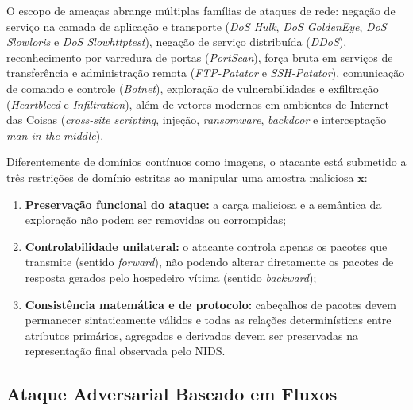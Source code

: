 \documentclass[conference]{IEEEtran}
\begin{document}
O escopo de ameaças abrange múltiplas famílias de ataques de rede: negação de serviço na camada de aplicação e transporte (\textit{DoS Hulk}, \textit{DoS GoldenEye}, \textit{DoS Slowloris} e \textit{DoS Slowhttptest}), negação de serviço distribuída (\textit{DDoS}), reconhecimento por varredura de portas (\textit{PortScan}), força bruta em serviços de transferência e administração remota (\textit{FTP-Patator} e \textit{SSH-Patator}), comunicação de comando e controle (\textit{Botnet}), exploração de vulnerabilidades e exfiltração (\textit{Heartbleed} e \textit{Infiltration}), além de vetores modernos em ambientes de Internet das Coisas (\textit{cross-site scripting}, injeção, \textit{ransomware}, \textit{backdoor} e interceptação \textit{man-in-the-middle}).

Diferentemente de domínios contínuos como imagens, o atacante está submetido a três restrições de domínio estritas ao manipular uma amostra maliciosa $\mathbf{x}$:
\begin{enumerate}
    \item \textbf{Preservação funcional do ataque:} a carga maliciosa e a semântica da exploração não podem ser removidas ou corrompidas;
    \item \textbf{Controlabilidade unilateral:} o atacante controla apenas os pacotes que transmite (sentido \textit{forward}), não podendo alterar diretamente os pacotes de resposta gerados pelo hospedeiro vítima (sentido \textit{backward});
    \item \textbf{Consistência matemática e de protocolo:} cabeçalhos de pacotes devem permanecer sintaticamente válidos e todas as relações determinísticas entre atributos primários, agregados e derivados devem ser preservadas na representação final observada pelo NIDS.
\end{enumerate}

\subsection{Ataque Adversarial Baseado em Fluxos}
\end{document}
